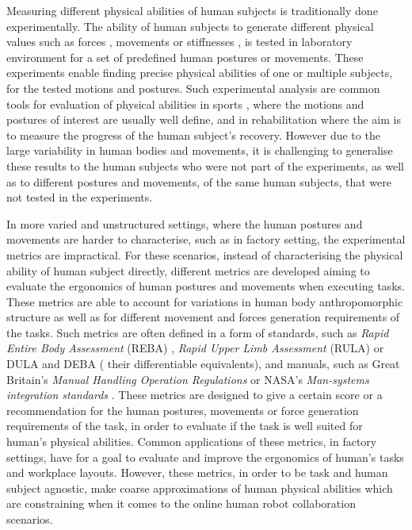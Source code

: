 Measuring different physical abilities of human subjects is traditionally done experimentally. The ability of human subjects to generate different physical values such as forces \cite{HODDER2016Testing,HOLZBAUR20072442}, movements \cite{Jessop2016} or stiffnesses \cite{Tsuji1995,Artemiadis2010}, is tested in laboratory environment for a set of predefined human postures or movements. These experiments enable finding precise physical abilities of one or multiple subjects, for the tested motions and postures.  Such experimental analysis are common tools for evaluation of physical abilities in sports \cite{Jessop2016}, where the motions and postures of interest are usually well define, and in rehabilitation \cite{HAISMA2006741} where the aim is to measure the progress of the human subject's recovery. However due to the large variability in human bodies and movements, it is challenging to generalise these results to the human subjects who were not part of the experiments, as well as to different postures and movements, of the same human subjects, that were not tested in the experiments.

In more varied and unstructured settings, where the human postures and movements are harder to characterise, such as in factory setting, the experimental metrics are impractical. For these scenarios, instead of characterising the physical ability of human subject directly, different metrics are developed aiming to evaluate the ergonomics of human postures and movements when executing tasks. These metrics are able to account for variations in human body anthropomorphic structure as well as for different movement and forces generation requirements of the tasks. Such metrics are often defined in a form of standards, such as \textit{Rapid Entire Body Assessment} (REBA) \cite{reba}, \textit{Rapid Upper Limb Assessment} (RULA) \cite{rula} or DULA and DEBA \cite{Yazdani2022} ( their differentiable equivalents), and manuals, such as Great Britain's \textit{Manual Handling Operation Regulations} \cite{health1992manual} or NASA's \textit{Man-systems integration standards} \cite{nasa}. These metrics are designed to give a certain score or a recommendation for the human postures, movements or force generation requirements of the task, in order to evaluate if the task is well suited for human's physical abilities. Common applications of these metrics, in factory settings, have for a goal to evaluate and improve the ergonomics of human's tasks \cite{Busch2017} and workplace layouts\cite{ORE20161, Lietaert2019}. However, these metrics, in order to be task and human subject agnostic, make coarse approximations of human physical abilities which are constraining when it comes to the online human robot collaboration scenarios. 

